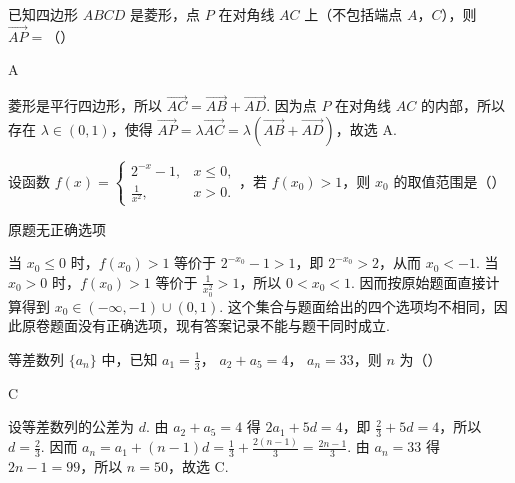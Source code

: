 \begin{problem}
已知四边形 \(ABCD\) 是菱形，点 \(P\) 在对角线 \(AC\) 上（不包括端点 \(A\)，\(C\)），则 \( \overrightarrow{AP} = \)（\quad）
\begin{answer}
A
\end{answer}

\begin{solution}
菱形是平行四边形，所以 \(\overrightarrow{AC}=\overrightarrow{AB}+\overrightarrow{AD}\). 因为点 \(P\) 在对角线 \(AC\) 的内部，所以存在 \(\lambda\in(0,1)\)，使得 \(\overrightarrow{AP}=\lambda\overrightarrow{AC}=\lambda(\overrightarrow{AB}+\overrightarrow{AD})\)，故选 A.
\end{solution}
\end{problem}

\begin{problem}
设函数 \( f(x)=\begin{cases}
2^{-x}-1, & x\leq 0,\\
\frac{1}{x^{2}}, & x>0.
\end{cases} \)，若 \( f(x_{0})>1 \)，则 \( x_{0} \) 的取值范围是（\quad）
\begin{answer}
原题无正确选项
\end{answer}

\begin{solution}
当 \(x_{0}\leq0\) 时，\(f(x_{0})>1\) 等价于 \(2^{-x_{0}}-1>1\)，即 \(2^{-x_{0}}>2\)，从而 \(x_{0}<-1\). 当 \(x_{0}>0\) 时，\(f(x_{0})>1\) 等价于 \(\frac{1}{x_{0}^{2}}>1\)，所以 \(0<x_{0}<1\). 因而按原始题面直接计算得到
\(x_{0}\in(-\infty,-1)\cup(0,1)\).
这个集合与题面给出的四个选项均不相同，因此原卷题面没有正确选项，现有答案记录不能与题干同时成立.
\end{solution}
\end{problem}

\begin{problem}
等差数列 \( \{a_{n}\} \) 中，已知 \( a_{1}=\frac{1}{3} \)， \( a_{2}+a_{5}=4 \)， \( a_{n}=33 \)，则 \(n\) 为（\quad）
\begin{answer}
C
\end{answer}

\begin{solution}
设等差数列的公差为 \(d\). 由 \(a_{2}+a_{5}=4\) 得 \(2a_{1}+5d=4\)，即 \(\frac{2}{3}+5d=4\)，所以 \(d=\frac{2}{3}\). 因而 \(a_{n}=a_{1}+(n-1)d=\frac{1}{3}+\frac{2(n-1)}{3}=\frac{2n-1}{3}\). 由 \(a_{n}=33\) 得 \(2n-1=99\)，所以 \(n=50\)，故选 C.
\end{solution}
\end{problem}


